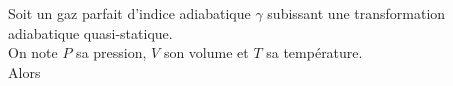 ﻿\documentclass[a4paper]{article}
\begin{document}
\pagestyle{fancy}
\fancyhf{}
\setlength{\headheight}{15pt}

\begin{center}
	\large{}
\end{center}


Soit un gaz parfait d'indice adiabatique \(\gamma\) subissant une transformation adiabatique quasi-statique.\\
On note \(P\) sa pression, \(V\) son volume et \(T\) sa température.\\
Alors \begin{center}
\end{center}
\end{document}
